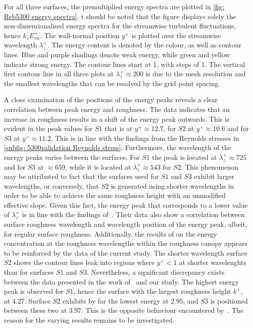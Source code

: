 For all three surfaces, the premultiplied energy spectra are plotted in \autoref{fig: Reb5300 energy spectra}.
t should be noted that the figure displays solely  the non-dimensionalised energy spectra for the streamwise turbulent fluctuations, hence $k_zE_{uu}^+$.
The wall-normal position $y^+$ is plotted over the streamwise wavelength $\lambda_z^+$.
The energy content is denoted by the colour, as well as contour lines.
Blue and purple shadings denote weak energy, while green and yellow indicate strong energy.
The contour lines start at 1, with steps of 1.
The vertical first contour line in all three plots at $\lambda_z^+ \approx 200$ is due to the mesh resolution and the smallest wavelengths that can be resolved by the grid point spacing.

A close examination of the positions of the energy peaks reveals a clear correlation between peak energy and roughness. The data indicates that an increase in roughness results in a shift of the energy peak outwards. 
This is evident in the peak values for $S1$ that  is at $y^+ \approx 12.7$, for $S2$ at $y^+ \approx 10.6$ and for $S3$ at $y^+ \approx 11.2$.
This is in line with the findings from the Reynolds stresses in \autoref{subfig: 5300validation Reynolds stress}.
Furthermore, the wavelength of the energy peaks varies between the surfaces. 
For $S1$ the peak is located at $\lambda_z^+ \approx 725$ and for $S3$ at $\approx 659$, while it is located at $\lambda_z^+ \approx 543$ for $S2$.
This phenomenon may be attributed to  fact that the surfaces used for $S1$ and $S3$ exhibit larger wavelengths, or conversely, that $S2$ is generated using shorter wavelengths in order to be able to achieve the same roughness height with an unmodified effective slope.
Given this fact, the energy peak that corresponds to a lower value of $\lambda_z^+$  is in line with the findings of~\cite{chanSecondaryMotionTurbulent2018}.
Their data also show a correlation between surface roughness wavelength and wavelength position of the energy peak, albeit, for regular surface roughness.
Additionally, the results of \citeauthor{chanSecondaryMotionTurbulent2018} on the energy concentration at the roughness wavelengths within the roughness canopy appears to be reinforced by the data of the current study.
The shorter wavelength surface $S2$ shows the contour lines leak into regions where $y^+ < 1$  at shorter wavelenghts than  for   surfaces $S1$ and $S3$.
Nevertheless, a significant discrepancy exists between the data presented in the work  of~\citeauthor{chanSecondaryMotionTurbulent2018} and our study.
The highest energy peak is observed for $S1$, hence the surface with the largest roughness height $k^+$, at $4.27$.
Surface $S2$ exhibits by far the lowest energy at $2.95$, and $S3$  is positioned between these two at $3.97$.
This is the opposite behaviour  encountered by~\citeauthor{chanSecondaryMotionTurbulent2018}.
The reason for the varying results remains to be investigated. 

